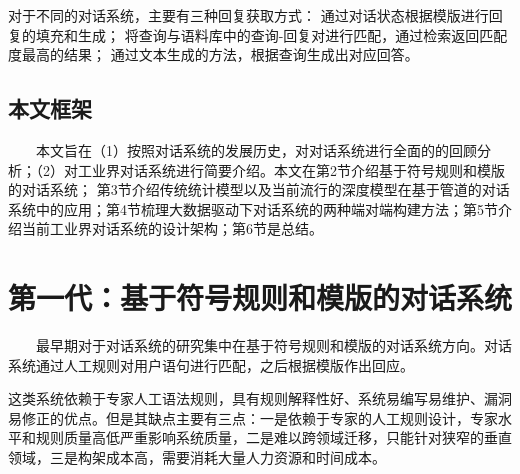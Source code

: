 \documentclass{clv3}
\begin{document}
对于不同的对话系统，主要有三种回复获取方式：
通过对话状态根据模版进行回复的填充和生成；
将查询与语料库中的查询-回复对进行匹配，通过检索返回匹配度最高的结果；
通过文本生成的方法，根据查询生成出对应回答。



\subsection{本文框架}
$\qquad$本文旨在（1）按照对话系统的发展历史，对对话系统进行全面的的回顾分析；（2）对工业界对话系统进行简要介绍。本文在第2节介绍基于符号规则和模版的对话系统；
第3节介绍传统统计模型以及当前流行的深度模型在基于管道的对话系统中的应用；第4节梳理大数据驱动下对话系统的两种端对端构建方法；第5节介绍当前工业界对话系统的设计架构；第6节是总结。

\section{第一代：基于符号规则和模版的对话系统}
$\qquad$最早期对于对话系统的研究\cite{weizenbaum1966eliza, wilensky1988the}集中在基于符号规则和模版的对话系统方向。对话系统通过人工规则对用户语句进行匹配，之后根据模版作出回应。

这类系统\cite{epstein2008parsing, marietto2013artificial}依赖于专家人工语法规则，具有规则解释性好、系统易编写易维护、漏洞易修正的优点。但是其缺点主要有三点：一是依赖于专家的人工规则设计，专家水平和规则质量高低严重影响系统质量，二是难以跨领域迁移，只能针对狭窄的垂直领域，三是构架成本高，需要消耗大量人力资源和时间成本。
\end{document}
